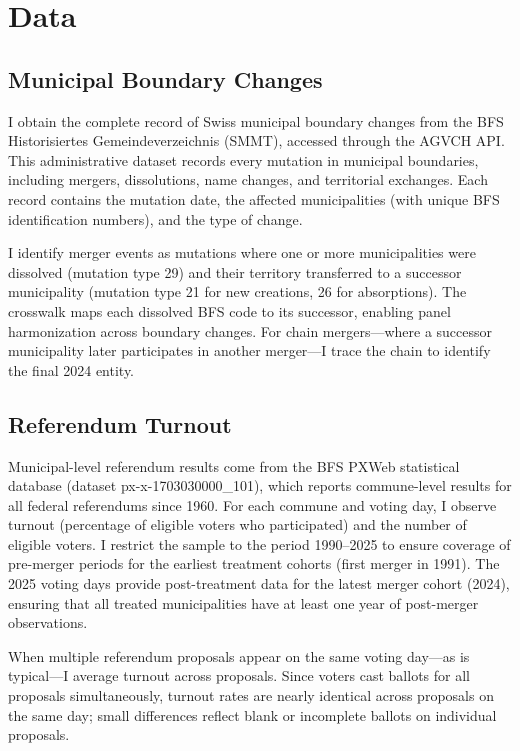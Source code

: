 \documentclass[12pt]{article}
\begin{document}
\section{Data}

\subsection{Municipal Boundary Changes}

I obtain the complete record of Swiss municipal boundary changes from the BFS Historisiertes Gemeindeverzeichnis (SMMT), accessed through the AGVCH API. This administrative dataset records every mutation in municipal boundaries, including mergers, dissolutions, name changes, and territorial exchanges. Each record contains the mutation date, the affected municipalities (with unique BFS identification numbers), and the type of change.

I identify merger events as mutations where one or more municipalities were dissolved (mutation type 29) and their territory transferred to a successor municipality (mutation type 21 for new creations, 26 for absorptions). The crosswalk maps each dissolved BFS code to its successor, enabling panel harmonization across boundary changes. For chain mergers---where a successor municipality later participates in another merger---I trace the chain to identify the final 2024 entity.

\subsection{Referendum Turnout}

Municipal-level referendum results come from the BFS PXWeb statistical database (dataset px-x-1703030000\_101), which reports commune-level results for all federal referendums since 1960. For each commune and voting day, I observe turnout (percentage of eligible voters who participated) and the number of eligible voters. I restrict the sample to the period 1990--2025 to ensure coverage of pre-merger periods for the earliest treatment cohorts (first merger in 1991). The 2025 voting days provide post-treatment data for the latest merger cohort (2024), ensuring that all treated municipalities have at least one year of post-merger observations.

When multiple referendum proposals appear on the same voting day---as is typical---I average turnout across proposals. Since voters cast ballots for all proposals simultaneously, turnout rates are nearly identical across proposals on the same day; small differences reflect blank or incomplete ballots on individual proposals.
\end{document}
